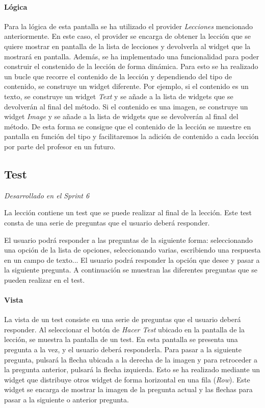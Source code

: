 \paragraph*{Lógica}
Para la lógica de esta pantalla se ha utilizado el provider \textit{Lecciones} mencionado anteriormente. En este caso, el provider se encarga de obtener la lección que se quiere mostrar en pantalla de la lista de lecciones y devolverla al widget que la mostrará en pantalla.
Además, se ha implementado una funcionalidad para poder construir el constenido de la lección de forma dinámica. Para esto se ha realizado un bucle que recorre el contenido de la lección y dependiendo del tipo de contenido, se construye un widget diferente. Por ejemplo, si el contenido es un texto, se construye un widget \textit{Text} y se añade a la lista de widgets que se devolverán al final del método. Si el contenido es una imagen, se construye un widget \textit{Image} y se añade a la lista de widgets que se devolverán al final del método. De esta forma 
se consigue que el contenido de la lección se muestre en pantalla en función del tipo y facilitaremos la adición de contenido a cada lección por parte del profesor en un futuro.

\subsection{Test}
\label{sec:test}
\textit{Desarrollado en el Sprint 6}

La lección contiene un test que se puede realizar al final de la lección. Este test consta de una serie de preguntas que el usuario deberá responder.

El usuario podrá responder a las preguntas de la siguiente forma: seleccionando una opción de la lista de opciones, seleccionando varias, escribiendo una respuesta en un campo de texto... El usuario podrá 
responder la opción que desee y pasar a la siguiente pregunta. A continuación se muestran las diferentes preguntas que se pueden realizar en el test.


\paragraph*{Vista}
La vista de un test consiste en una serie de preguntas que el usuario deberá responder. Al seleccionar el botón de \textit{Hacer Test} ubicado en la pantalla de la lección, se muestra la pantalla de un test.
En esta pantalla se presenta una pregunta a la vez, y el usuario deberá responderla. Para pasar a la siguiente pregunta, pulsará la flecha ubicada a la derecha de la imagen y para retroceder a la pregunta anterior, pulsará la flecha izquierda.
Esto se ha realizado mediante un widget que distribuye otros widget de forma horizontal en una fila (\textit{Row}). Este widget se encarga de mostrar la imagen de la pregunta actual y las flechas para pasar a la siguiente o anterior pregunta.

